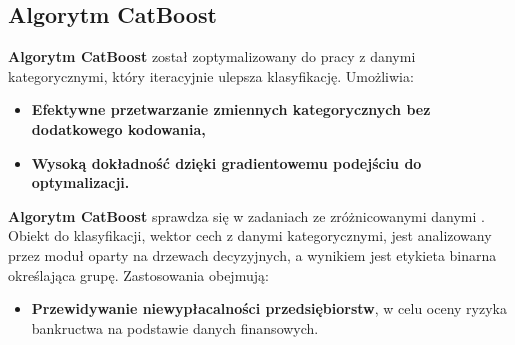 \subsection{Algorytm CatBoost}
\textbf{Algorytm CatBoost} został zoptymalizowany do pracy z danymi kategorycznymi, który iteracyjnie ulepsza klasyfikację. Umożliwia:
\begin{itemize}
	\item
	      \textbf{Efektywne przetwarzanie zmiennych kategorycznych bez dodatkowego kodowania,}
	\item
	      \textbf{Wysoką dokładność dzięki gradientowemu podejściu do optymalizacji.}
\end{itemize}
\textbf{Algorytm CatBoost} sprawdza się w zadaniach ze zróżnicowanymi danymi \cite{CatBoost}. Obiekt do klasyfikacji, wektor cech z danymi kategorycznymi, jest analizowany przez moduł oparty na drzewach decyzyjnych, a wynikiem jest etykieta binarna określająca grupę. Zastosowania obejmują:
\begin{itemize}
	\item
	      \textbf{Przewidywanie niewypłacalności przedsiębiorstw}, w celu oceny ryzyka bankructwa na podstawie danych finansowych.
\end{itemize}